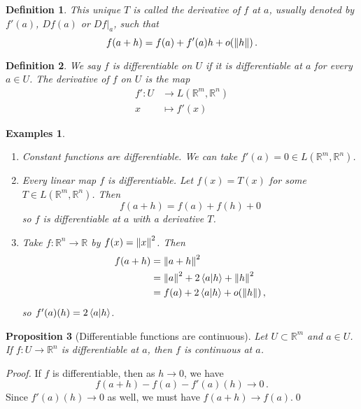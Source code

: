 \documentclass{article}
\theoremstyle{plain}\theoremheaderfont{\normalfont\itshape}\theorembodyfont{\rmfamily}\theoremseparator{.}\newtheorem*{rem}{Remark}\newtheorem*{ex}{Example}\newtheorem*{proof}{Proof}\newtheorem*{altp}{Alternative proof}
\theoremstyle{plain}\theoremheaderfont{\normalfont\bfseries}\theorembodyfont{\rmfamily}\theoremseparator{.}\newtheorem{thm}{Theorem}[section]\newtheorem{lem}[thm]{Lemma}\newtheorem{prop}[thm]{Proposition}\newtheorem*{cor}{Corollary}\newtheorem{defn}[thm]{Definition}\newtheorem{clm}[thm]{Claim}\newtheorem{clminproof}{Claim}
\theoremstyle{break}\theoremheaderfont{\normalfont\itshape}\theorembodyfont{\rmfamily}\theoremseparator{.\medskip}\newtheorem*{proofskip}{Proof}\newtheorem*{exs}{Examples}\newtheorem*{rems}{Remarks}
\theoremstyle{break}\theoremheaderfont{\normalfont\bfseries}\theorembodyfont{\rmfamily}\theoremseparator{.\medskip}\newtheorem{lemskip}[thm]{Lemma}\newtheorem{defnskip}[thm]{Definition}\newtheorem{propskip}[thm]{Proposition}\newtheorem{thmskip}[thm]{Theorem}
\newcommand{\qed}{\hfill\ensuremath{\Box}}
\begin{document}
    \begin{defn}
        This unique \(T\) is called the \textit{derivative} of \(f\) at \(a\), usually denoted by \(f'(a)\), \(Df(a)\) or \(Df|_a\), such that
        \[f(a+h)=f(a)+f'(a)h+o(\norm{h})\,.\]
    \end{defn}
    \begin{defn}
        We say \(f\) is \textit{differentiable} on \(U\) if it is differentiable at \(a\) for every \(a\in U\). The \textit{derivative} of \(f\) on \(U\) is the map
        \begin{align*}
            f':U&\to L(\mathbb{R}^m,\mathbb{R}^n)\\
            x&\mapsto f'(x)
        \end{align*}
    \end{defn}
    \begin{exs}
        \begin{enumerate}[label=(\roman*),topsep=0pt]
            \item Constant functions are differentiable. We can take \(f'(a)=0\in L(\mathbb{R}^m,\mathbb{R}^n)\).
            \item Every linear map \(f\) is differentiable. Let \(f(x)=T(x)\) for some \(T\in L(\mathbb{R}^m,\mathbb{R}^n)\). Then
            \[f(a+h)=f(a)+f(h)+0\]
            so \(f\) is differentiable at \(a\) with a derivative \(T\).
            \item Take \(f:\mathbb{R}^n\to\mathbb{R}\) by \(f(x)=\norm{x}^2\). Then
            \begin{align*}
                f(a+h)&=\norm{a+h}^2\\
                &=\norm{a}^2+2\braket{a}{h}+\norm{h}^2\\
                &=f(a)+2\braket{a}{h}+o(\norm{h})\,,
            \end{align*}
            so \(f'(a)(h)=2\braket{a}{h}\).
        \end{enumerate}
    \end{exs}
    \begin{prop}[Differentiable functions are continuous]
        Let \(U\subset\mathbb{R}^m\) and \(a\in U\). If \(f:U\to\mathbb{R}^n\) is differentiable at \(a\), then \(f\) is continuous at \(a\).
    \end{prop}
    \begin{proof}
        If \(f\) is differentiable, then as \(h\to 0\), we have
        \[f(a+h)-f(a)-f'(a)(h)\to 0\,.\]
        Since \(f'(a)(h)\to 0\) as well, we must have \(f(a+h)\to f(a)\).\qed
    \end{proof}
\end{document}
